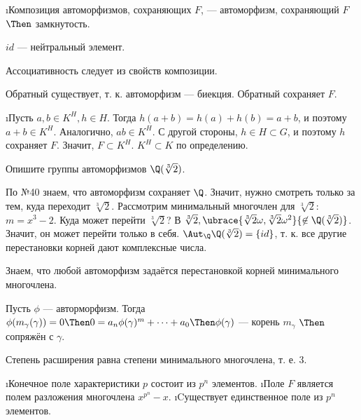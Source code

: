 \begin{solution}
\begin{enumerate}
\def\labelenumi{\alph{enumi})}
\i Композиция автоморфизмов, сохраняющих \(F\), --- автоморфизм, сохраняющий \(F\) \(\Then\) замкнутость.

\(id\) --- нейтральный элемент.

Ассоциативность следует из свойств композиции.

Обратный существует, т. к. автоморфизм --- биекция. Обратный сохраняет \(F\).

\i Пусть \(a, b \in K^H, h \in H\). Тогда \(h(a + b) = h(a) + h(b) = a + b\), и поэтому \(a + b \in K^H\). Аналогично, \(ab \in K^H\). С другой стороны, \(h \in H \subset G\), и поэтому \(h\) сохраняет \(F\). Значит, \(F \subset K^H\).
\(K^H \subset K\) по определению.
\end{enumerate}
\end{solution}

\begin{problem}[42 (10.5)]
Опишите группы автоморфизмов $\Q(\sqrt[3]{2})$.
\end{problem}

\begin{solution}
По №40 знаем, что автоморфизм сохраняет $\Q$. Значит, нужно смотреть только за тем, куда переходит $\sqrt[3]{2}$.
Рассмотрим минимальный многочлен для $\sqrt[3]{2}$: $m = x^3-2$.
Куда может перейти $\sqrt[3]{2}$? В $\sqrt[3]{2}, \ubrace{\sqrt[3]{2}\omega, \sqrt[3]{2}\omega^2}{\not\in \Q(\sqrt[3]{2})}$. Значит, он может перейти только в себя. \(\Aut_\Q \Q(\sqrt[3]{2}) = \{id\}\), т. к. все другие перестановки корней дают комплексные числа.

Знаем, что любой автоморфизм задаётся перестановкой корней минимального многочлена.

Пусть \(\phi\) --- авторморфизм. Тогда \(\phi(m_\gamma(\gamma)) = 0 \Then 0 = a_n \phi(\gamma)^m+\dots+a_0 \Then \phi(\gamma)\) --- корень \(m_\gamma\) \(\Then\) сопряжён с \(\gamma\).

Степень расширения равна степени минимального многочлена, т. е. $3$.
\end{solution}

\begin{problem}
\begin{enumerate}
\def\labelenumi{\alph{enumi})}
\i Конечное поле характеристики $p$ состоит из $p^n$ элементов. 
\i Поле $F$ является полем разложения многочлена $x^{p^n}-x$. 
\i Cуществует единственное поле из $p^n$ элементов.
\end{enumerate}
\end{problem}

